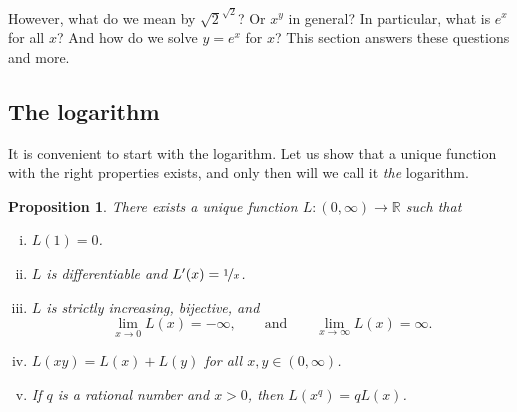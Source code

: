 \documentclass[12pt]{book}
\newcommand{\R}{{\mathbb{R}}}
\theoremstyle{plain}
\newtheorem{prop}[thm]{Proposition}
\theoremstyle{remark}
\theoremstyle{definition}
\theoremstyle{exercise}
\theoremstyle{example}
\begin{document}
However, what do we mean by $\sqrt{2}^{\sqrt{2}}$?  Or
$x^y$ in general?  In particular, what is $e^x$ for all $x$?
And how do we solve $y=e^x$ for $x$?
This section answers these questions and more.

\subsection{The logarithm}

It is convenient to start with the logarithm.  
Let us show that
a unique function with the right properties exists, and only then will
we call it \emph{the} logarithm.

\begin{prop}
There exists a unique function $L \colon (0,\infty) \to \R$ such that
\begin{enumerate}[(i)]
\item \label{it:log:i}
$L(1) = 0$.
\item \label{it:log:ii}
$L$ is differentiable and $L'(x) = \nicefrac{1}{x}$.
\item \label{it:log:iii}
$L$ is strictly increasing, bijective, and
\begin{equation*}
\lim_{x\to 0} L(x) = -\infty , \qquad \text{and} \qquad
\lim_{x\to \infty} L(x) = \infty .
\end{equation*}
\item \label{it:log:iv}
$L(xy) = L(x)+L(y)$ for all $x,y \in (0,\infty)$.
\item \label{it:log:v}
If $q$ is a rational number and $x > 0$, then
$L(x^q) = q L(x)$.
\end{enumerate}
\end{prop}
\end{document}
